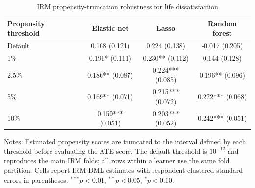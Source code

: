 \begin{table}[!htbp]
\centering
\caption{IRM propensity-truncation robustness for life dissatisfaction}
\label{tab:robustness_irm_trimming}
\small
\setlength{\tabcolsep}{7pt}
\begin{tabular}{lccc}
\hline
Propensity threshold & Elastic net & Lasso & Random forest
\\
\hline
Default & 0.168 (0.121) & 0.224 (0.138) & -0.017 (0.205)
\\
1\% & 0.191* (0.111) & 0.230** (0.112) & 0.144 (0.128)
\\
2.5\% & 0.186** (0.087) & 0.224*** (0.085) & 0.196** (0.096)
\\
5\% & 0.169** (0.071) & 0.215*** (0.072) & 0.222*** (0.068)
\\
10\% & 0.159*** (0.051) & 0.203*** (0.052) & 0.242*** (0.051)
\\
\hline
\end{tabular}
\begin{minipage}{0.96\textwidth}
\footnotesize Notes: Estimated propensity scores are truncated to the interval defined by each threshold before evaluating the ATE score. The default threshold is $10^{-12}$ and reproduces the main IRM folds; all rows within a learner use the same fold partition. Cells report IRM-DML estimates with respondent-clustered standard errors in parentheses. $^{***}p<0.01$, $^{**}p<0.05$, $^{*}p<0.10$.
\end{minipage}
\end{table}
